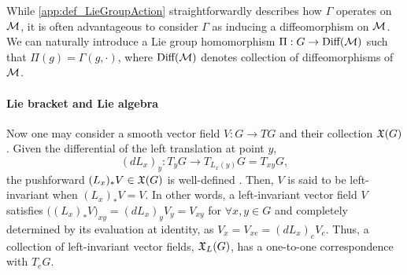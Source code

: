 While \cref{app:def_LieGroupAction} straightforwardly describes how $\Gamma$ operates on $\mathcal{M}$,
it is often advantageous to consider $\Gamma$ as inducing a diffeomorphism on $\mathcal{M}$.
We can naturally introduce a Lie group homomorphism
$\Pi: G \to \text{Diff}(\mathcal{M})$ such that $\Pi(g)=\Gamma(g,\cdot)$,
where $\text{Diff}(\mathcal{M})$ denotes collection of diffeomorphisms of $\mathcal{M}$.
\paragraph{Lie bracket and Lie algebra}
Now one may consider a smooth vector field $V: G \to TG$
and their collection $\mathfrak{X}(G)$.
Given the differential of the left translation at point $y$,
\begin{equation*}
    (dL_x)_y: T_yG \to T_{L_x(y)}G = T_{xy}G,
\end{equation*}
the pushforward $(L_x)_*V \in \mathfrak{X}(G)$ is well-defined \cite{tu2008manifold,lee2003smooth}.
Then, $V$ is said to be left-invariant when $(L_x)_*V = V$.
In other words, a left-invariant vector field $V$
satisfies $\bigl((L_x)_*V\bigr)_{xy} = (dL_x)_yV_y = V_{xy}$ for $\forall x, y \in G$
and completely determined by its evaluation at identity, as $V_x = V_{xe} = (dL_x)_e V_e$.
Thus, a collection of left-invariant vector fields, $\mathfrak{X}_L(G)$, has a one-to-one correspondence with $T_e G$.

